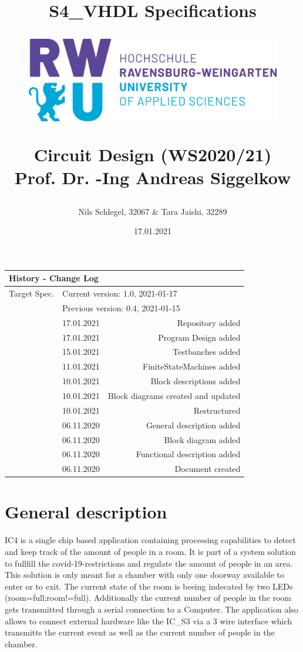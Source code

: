 \documentclass[12pt,a4 paper] {report}
\title{
	\textbf{S4\_VHDL Specifications} \\
	\begin{figure}[h]
		\centering
		\includegraphics[scale=0.4]{../png/rwu.png}
	\end{figure}
	Circuit Design (WS2020/21) \\
	Prof. Dr. -Ing Andreas Siggelkow \\
}
\author{Nils Schlegel, 32067 \& Tara Jaishi, 32289}
\date{17.01.2021}
\begin{document}
\maketitle

\newpage

\begin{center}
	\begin{tabular}{llr}
		\multicolumn{3}{l}{\textbf{History - Change Log}} \\
		\hline
		Target Spec. & \multicolumn{2}{l}{Current version: 1.0, 2021-01-17} \\
		& \multicolumn{2}{l}{Previous version: 0.4, 2021-01-15} \\
		\hline
		&	17.01.2021 & Repository added \\
		&	17.01.2021 & Program Design added \\
		&	15.01.2021 & Testbanches added \\
		&	11.01.2021 & FiniteStateMachines added \\
		&	10.01.2021 & Block descriptions added \\
		&	10.01.2021 & Block diagrams created and updated \\
		&	10.01.2021 & Restructured \\
		&	06.11.2020 & General description added \\
		&	06.11.2020 & Block diagram added \\
		&	06.11.2020 & Functional description added \\
		&	06.11.2020 & Document created
	\end{tabular}
\end{center}

\newpage

\tableofcontents

\newpage

\chapter{General description}
IC4 is a single chip based application containing processing capabilities to detect and keep track of the amount of people in a room. 
It is part of a system solution to fullfill the covid-19-restrictions and regulate the amount of people in an area. This solution is only 
meant for a chamber with only one doorway available to enter or to exit.\newline
The current state of the room is beeing indecated by two LEDs (room=full;room!=full). Additionally the current number of people in the room 
gets transmitted through a serial connection to a Computer. The application also allows to connect external hardware like the IC\_S3 via a 
3 wire interface which transmitts the current event as well as the current number of people in the chamber.
\end{document}
